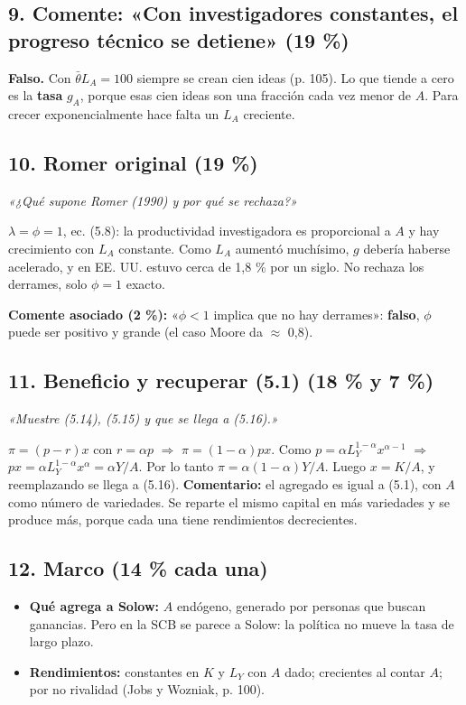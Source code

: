 \documentclass[11pt,a4paper]{article}
\begin{document}
\subsection*{9. Comente: «Con investigadores constantes, el progreso técnico se detiene» (19 \%)}

\textbf{Falso.} Con $\bar\theta L_A = 100$ siempre se crean cien ideas (p. 105). Lo que tiende a cero es la \textbf{tasa} $g_A$, porque esas cien ideas son una fracción cada vez menor de $A$. Para crecer exponencialmente hace falta un $L_A$ creciente.

\subsection*{10. Romer original (19 \%)}

\emph{«¿Qué supone Romer (1990) y por qué se rechaza?»}

$\lambda = \phi = 1$, ec. (5.8): la productividad investigadora es proporcional a $A$ y hay crecimiento con $L_A$ constante. Como $L_A$ aumentó muchísimo, $g$ debería haberse acelerado, y en EE. UU. estuvo cerca de 1,8 \% por un siglo. No rechaza los derrames, solo $\phi = 1$ exacto.

\textbf{Comente asociado (2 \%):} «$\phi < 1$ implica que no hay derrames»: \textbf{falso}, $\phi$ puede ser positivo y grande (el caso Moore da $\approx$ 0,8).

\subsection*{11. Beneficio y recuperar (5.1) (18 \% y 7 \%)}

\emph{«Muestre (5.14), (5.15) y que se llega a (5.16).»}

$\pi = (p-r)x$ con $r = \alpha p$ $\Rightarrow$ $\pi = (1-\alpha)px$. Como $p = \alpha L_Y^{1-\alpha}x^{\alpha-1}$ $\Rightarrow$ $px = \alpha L_Y^{1-\alpha}x^\alpha = \alpha Y/A$. Por lo tanto $\pi = \alpha(1-\alpha)Y/A$. Luego $x = K/A$, y reemplazando se llega a (5.16). \textbf{Comentario:} el agregado es igual a (5.1), con $A$ como número de variedades. Se reparte el mismo capital en más variedades y se produce más, porque cada una tiene rendimientos decrecientes.

\subsection*{12. Marco (14 \% cada una)}

\begin{itemize}[leftmargin=*,itemsep=2pt,topsep=2pt]
\item \textbf{Qué agrega a Solow:} $A$ endógeno, generado por personas que buscan ganancias. Pero en la SCB se parece a Solow: la política no mueve la tasa de largo plazo.
\item \textbf{Rendimientos:} constantes en $K$ y $L_Y$ con $A$ dado; crecientes al contar $A$; por no rivalidad (Jobs y Wozniak, p. 100).
\end{itemize}
\end{document}
